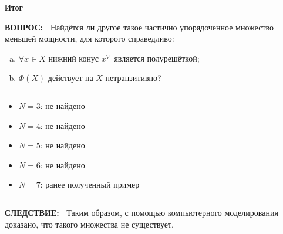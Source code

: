 \documentclass{beamer}
\newcommand{\green}{\color[rgb]{0,0.4,0}}
\newcommand{\consequence}{%
     {\bf \green СЛЕДСТВИЕ:\ }}
\newcommand{\question}{%
     {\bf \green ВОПРОС:\ }}
\newcommand{\retline}{

$ $

}
\begin{document}
\begin{frame}[fragile]
{\bf Итог}

{\question}
Найдётся ли другое такое частично упорядоченное множество меньшей мощности, для которого справедливо:
\begin{enumerate}[(a)]
	\item
$\forall x \in X$ нижний конус $x^\nabla$ является полурешёткой;
	\item
$\Phi(X)$ действует на $X$ нетранзитивно?
\end{enumerate}
{\retline}

\begin{itemize}
\item
$N = 3$: не найдено
\item
$N = 4$: не найдено
\item
$N = 5$: не найдено
\item
$N = 6$: не найдено
\item
$N = 7$: ранее полученный пример
\end{itemize}

{\retline}

{\consequence}
Таким образом, с помощью компьютерного моделирования доказано, что такого множества не существует.

\end{frame}
\end{document}
